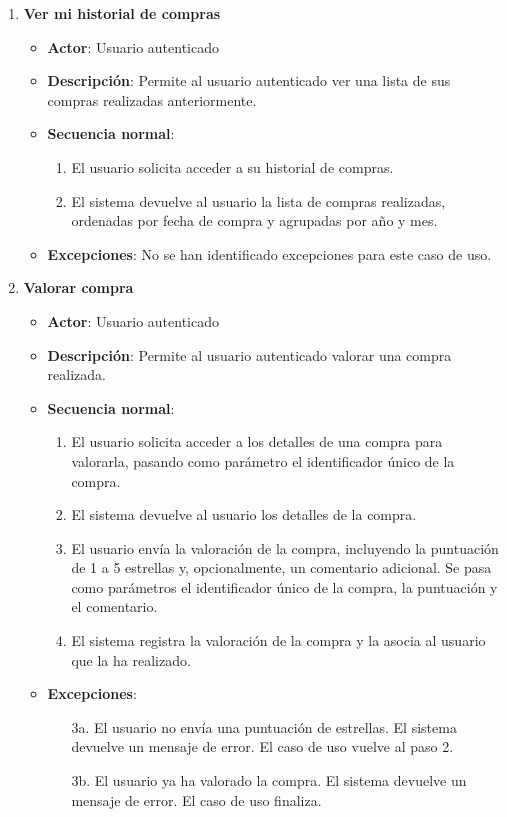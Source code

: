 \begin{enumerate}[label=UC-\protect\twodigits{\arabic*}:, align=left, leftmargin=*]
\item \textbf{Ver mi historial de compras}
\begin{itemize}
\item \textbf{Actor}: Usuario autenticado
\item \textbf{Descripción}: Permite al usuario autenticado ver una lista de sus compras realizadas anteriormente.
\item \textbf{Secuencia normal}:
\begin{enumerate}[label={\arabic*}:]
\item El usuario solicita acceder a su historial de compras.
\item El sistema devuelve al usuario la lista de compras realizadas, ordenadas por fecha de compra y agrupadas por año y mes.
\end{enumerate}
\item \textbf{Excepciones}: No se han identificado excepciones para este caso de uso.
\end{itemize}

\item \textbf{Valorar compra}
\begin{itemize}
\item \textbf{Actor}: Usuario autenticado
\item \textbf{Descripción}: Permite al usuario autenticado valorar una compra realizada.
\item \textbf{Secuencia normal}:
\begin{enumerate}[label={\arabic*}:]
\item El usuario solicita acceder a los detalles de una compra para valorarla, pasando como parámetro el identificador único de la compra.
\item El sistema devuelve al usuario los detalles de la compra.
\item El usuario envía la valoración de la compra, incluyendo la puntuación de 1 a 5 estrellas y, opcionalmente, un comentario adicional. Se pasa como parámetros el identificador único de la compra, la puntuación y el comentario.
\item El sistema registra la valoración de la compra y la asocia al usuario que la ha realizado.
\end{enumerate}
\item \textbf{Excepciones}:
\begin{itemize}
\item[3a.] El usuario no envía una puntuación de estrellas. El sistema devuelve un mensaje de error. El caso de uso vuelve al paso 2.
\item[3b.] El usuario ya ha valorado la compra. El sistema devuelve un mensaje de error. El caso de uso finaliza.
\end{itemize}
\end{itemize}


\end{enumerate}
